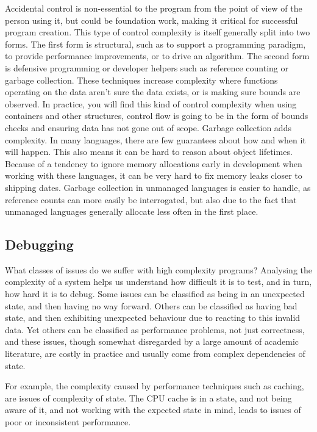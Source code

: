 \documentclass[a4paper,12pt]{book}
\begin{document}
Accidental control is non-essential to the program from the point of view of the person using it, but could be foundation work, making it critical for successful program creation.
This type of control complexity is itself generally split into two forms.
The first form is structural, such as to support a programming paradigm, to provide performance improvements, or to drive an algorithm.
The second form is defensive programming or developer helpers such as reference counting or garbage collection.
These techniques increase complexity where functions operating on the data aren't sure the data exists, or is making sure bounds are observed.
In practice, you will find this kind of control complexity when using containers and other structures, control flow is going to be in the form of bounds checks and ensuring data has not gone out of scope.
Garbage collection adds complexity.
In many languages, there are few guarantees about how and when it will happen.
This also means it can be hard to reason about object lifetimes.
Because of a tendency to ignore memory allocations early in development when working with these languages, it can be very hard to fix memory leaks closer to shipping dates.
Garbage collection in unmanaged languages is easier to handle, as reference counts can more easily be interrogated, but also due to the fact that unmanaged languages generally allocate less often in the first place.

\subsection{Debugging}

What classes of issues do we suffer with high complexity programs?
Analysing the complexity of a system helps us understand how difficult it is to test, and in turn, how hard it is to debug.
Some issues can be classified as being in an unexpected state, and then having no way forward.
Others can be classified as having bad state, and then exhibiting unexpected behaviour due to reacting to this invalid data.
Yet others can be classified as performance problems, not just correctness, and these issues, though somewhat disregarded by a large amount of academic literature, are costly in practice and usually come from complex dependencies of state.

For example, the complexity caused by performance techniques such as caching, are issues of complexity of state.
The CPU cache is in a state, and not being aware of it, and not working with the expected state in mind, leads to issues of poor or inconsistent performance.
\end{document}
